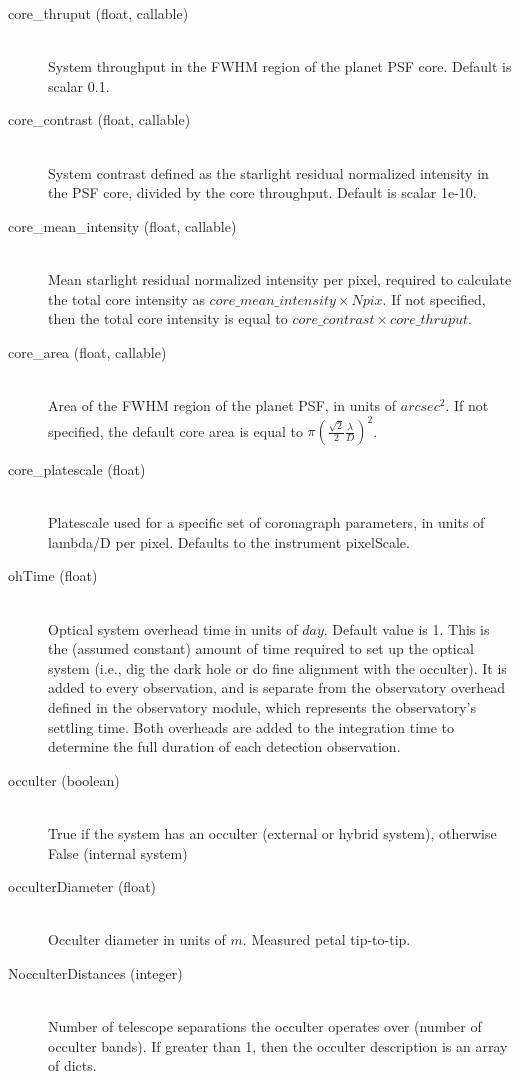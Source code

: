 \documentclass[cleanfoot]{asme2ej}
\begin{document}
\begin{itemize}
\begin{description}
\begin{description}
        \item[core\_thruput (float, callable)] \hfill \\ System throughput in the FWHM region of the planet PSF core. Default is scalar 0.1.
        \item[core\_contrast (float, callable)] \hfill \\ System contrast defined as the starlight residual normalized intensity in the PSF core, divided by the core throughput. Default is scalar 1e-10.
        \item[core\_mean\_intensity (float, callable)] \hfill \\ Mean starlight residual normalized intensity per pixel, required to calculate the total core intensity as $core\_mean\_intensity \times Npix$. If not specified, then the total core intensity is equal to $core\_contrast \times core\_thruput$.
        \item[core\_area (float, callable)] \hfill \\ Area of the FWHM region of the planet PSF, in units of $ arcsec^2 $. If not specified, the default core area is equal to $\pi\left(\frac{\sqrt 2}{2}\frac{\lambda}{D}\right)^2$.
        \item[core\_platescale (float)] \hfill \\ Platescale used for a specific set of coronagraph parameters, in units of lambda/D per pixel. Defaults to the instrument pixelScale.
        \item[ohTime (float)] \hfill \\ Optical system overhead time in units of $ day $.  Default value is 1.  This is the (assumed constant) amount of time required to set up the optical system (i.e., dig the dark hole or do fine alignment with the occulter).  It is added to every observation, and is separate from the observatory overhead defined in the observatory module, which represents the observatory's settling time.  Both overheads are added to the integration time to determine the full duration of each detection observation.
        \item[occulter (boolean)] \hfill \\ True if the system has an occulter (external or hybrid system), otherwise False (internal system)
        \item[occulterDiameter (float)]\hfill \\ Occulter diameter in units of $ m $.  Measured petal tip-to-tip.
        \item [NocculterDistances (integer)]\hfill \\ Number of telescope separations the occulter operates over (number of occulter bands). If greater than 1, then the occulter description is an array of dicts.

\end{description}
\end{description}
\end{itemize}
\end{document}
